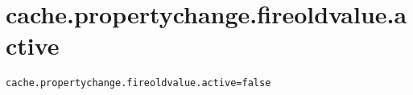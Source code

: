 \section{cache.propertychange.fireoldvalue.active}
\label{configuration:CachePropertychangeFireoldvalueActive}
\ClearAPI
\TODO
{}
\begin{lstlisting}[style=Props,caption={Usage example for \textit{cache.propertychange.fireoldvalue.active}}]
cache.propertychange.fireoldvalue.active=false
\end{lstlisting}